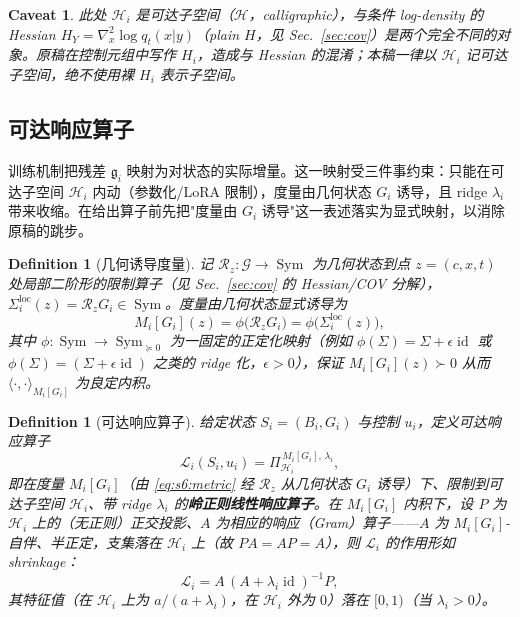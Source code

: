 \documentclass[11pt,a4paper]{article}
\newtheorem{definition}[theorem]{Definition}
\newtheorem{caveat}[theorem]{Caveat}
\DeclareMathOperator{\id}{id}
\newcommand{\cH}{\mathcal{H}}   %
\newcommand{\cL}{\mathcal{L}}   %
\newcommand{\cG}{\mathcal{G}}   %
\newcommand{\Rstr}{\mathcal{R}}     %
\newcommand{\ProjectOp}{\Pi}        %
\newcommand{\gres}{\bm{\mathfrak{g}}} %
\newcommand{\Sym}{\operatorname{Sym}}
\begin{document}
\begin{caveat}\label{cav:s6:Hsubspace}
此处 $\cH_i$ 是\emph{可达子空间}（$\cH$，calligraphic），与条件 log-density 的 Hessian $H_Y=\nabla_x^2\log q_t(x|y)$（plain $H$，见 Sec.~\ref{sec:cov}）是两个完全不同的对象。原稿在控制元组中写作 $H_i$，造成与 Hessian 的混淆；本稿一律以 $\cH_i$ 记可达子空间，绝不使用裸 $H_i$ 表示子空间。
\end{caveat}

\subsection{可达响应算子}

训练机制把残差 $\gres_i$ 映射为对状态的实际增量。这一映射受三件事约束：只能在可达子空间 $\cH_i$ 内动（参数化/LoRA 限制），度量由几何状态 $G_i$ 诱导，且 ridge $\lambda_i$ 带来收缩。在给出算子前先把"度量由 $G_i$ 诱导"这一表述落实为显式映射，以消除原稿的跳步。

\begin{definition}[几何诱导度量]\label{def:s6:metric}
记 $\Rstr_z:\cG\to\Sym$ 为几何状态到点 $z=(c,x,t)$ 处局部二阶形的限制算子（见 Sec.~\ref{sec:cov} 的 Hessian/COV 分解），$\Sigma_i^{\mathrm{loc}}(z)=\Rstr_z G_i\in\Sym$。度量由几何状态\emph{显式}诱导为
\begin{equation}\label{eq:s6:metric}
M_i[G_i](z)=\phi\bigl(\Rstr_z G_i\bigr)=\phi\bigl(\Sigma_i^{\mathrm{loc}}(z)\bigr),
\end{equation}
其中 $\phi:\Sym\to\Sym_{\succeq0}$ 为一固定的正定化映射（例如 $\phi(\Sigma)=\Sigma+\epsilon\id$ 或 $\phi(\Sigma)=(\Sigma+\epsilon\id)$ 之类的 ridge 化，$\epsilon>0$），保证 $M_i[G_i](z)\succ0$ 从而 $\langle\cdot,\cdot\rangle_{M_i[G_i]}$ 为良定内积。
\end{definition}

\begin{definition}[可达响应算子]\label{def:s6:response}
给定状态 $S_i=(B_i,G_i)$ 与控制 $u_i$，定义可达响应算子
\begin{equation}\label{eq:s6:response}
\cL_i(S_i,u_i)=\ProjectOp_{\cH_i}^{\,M_i[G_i],\,\lambda_i},
\end{equation}
即在度量 $M_i[G_i]$（由 \eqref{eq:s6:metric} 经 $\Rstr_z$ 从几何状态 $G_i$ 诱导）下、限制到可达子空间 $\cH_i$、带 ridge $\lambda_i$ 的\textbf{岭正则线性响应算子}。在 $M_i[G_i]$ 内积下，设 $P$ 为 $\cH_i$ 上的（无正则）正交投影、$A$ 为相应的响应（Gram）算子——$A$ 为 $M_i[G_i]$-自伴、半正定，支集落在 $\cH_i$ 上（故 $PA=AP=A$），则 $\cL_i$ 的作用形如 shrinkage：
\begin{equation}\label{eq:s6:shrink}
\cL_i=A\,(A+\lambda_i \id)^{-1}P,
\end{equation}
其特征值（在 $\cH_i$ 上为 $a/(a+\lambda_i)$，在 $\cH_i$ 外为 $0$）落在 $[0,1)$（当 $\lambda_i>0$）。
\end{definition}
\end{document}
